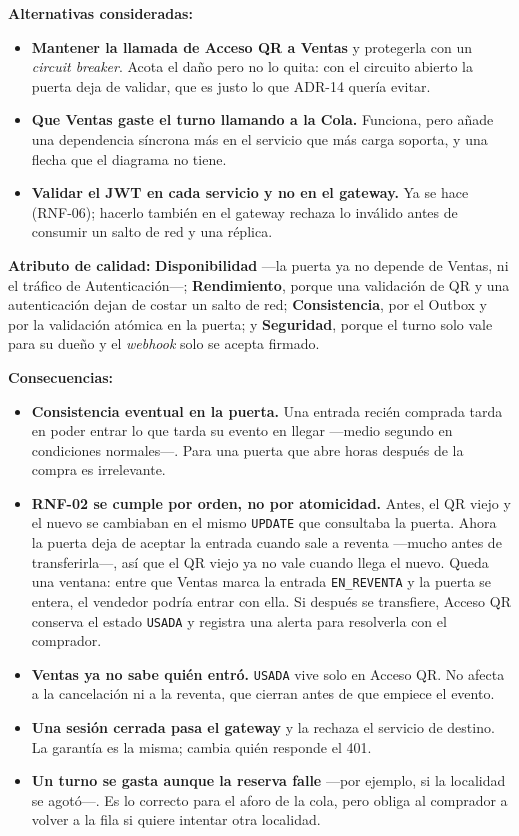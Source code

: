 \textbf{Alternativas consideradas:}
\begin{itemize}
  \item \textbf{Mantener la llamada de Acceso QR a Ventas} y protegerla con un
        \textit{circuit breaker}. Acota el daño pero no lo quita: con el
        circuito abierto la puerta deja de validar, que es justo lo que ADR-14
        quería evitar.
  \item \textbf{Que Ventas gaste el turno llamando a la Cola.} Funciona, pero
        añade una dependencia síncrona más en el servicio que más carga
        soporta, y una flecha que el diagrama no tiene.
  \item \textbf{Validar el JWT en cada servicio y no en el gateway.} Ya se hace
        (RNF-06); hacerlo también en el gateway rechaza lo inválido antes de
        consumir un salto de red y una réplica.
\end{itemize}

\textbf{Atributo de calidad:} \textbf{Disponibilidad} ---la puerta ya no
depende de Ventas, ni el tráfico de Autenticación---; \textbf{Rendimiento},
porque una validación de QR y una autenticación dejan de costar un salto de
red; \textbf{Consistencia}, por el Outbox y por la validación atómica en la
puerta; y \textbf{Seguridad}, porque el turno solo vale para su dueño y el
\textit{webhook} solo se acepta firmado.

\textbf{Consecuencias:}
\begin{itemize}
  \item \textbf{Consistencia eventual en la puerta.} Una entrada recién comprada
        tarda en poder entrar lo que tarda su evento en llegar ---medio segundo
        en condiciones normales---. Para una puerta que abre horas después de la
        compra es irrelevante.
  \item \textbf{RNF-02 se cumple por orden, no por atomicidad.} Antes, el QR
        viejo y el nuevo se cambiaban en el mismo \texttt{UPDATE} que consultaba
        la puerta. Ahora la puerta deja de aceptar la entrada cuando sale a
        reventa ---mucho antes de transferirla---, así que el QR viejo ya no
        vale cuando llega el nuevo. Queda una ventana: entre que Ventas marca la
        entrada \texttt{EN\_REVENTA} y la puerta se entera, el vendedor podría
        entrar con ella. Si después se transfiere, Acceso QR conserva el estado
        \texttt{USADA} y registra una alerta para resolverla con el comprador.
  \item \textbf{Ventas ya no sabe quién entró.} \texttt{USADA} vive solo en
        Acceso QR. No afecta a la cancelación ni a la reventa, que cierran antes
        de que empiece el evento.
  \item \textbf{Una sesión cerrada pasa el gateway} y la rechaza el servicio de
        destino. La garantía es la misma; cambia quién responde el 401.
  \item \textbf{Un turno se gasta aunque la reserva falle} ---por ejemplo, si la
        localidad se agotó---. Es lo correcto para el aforo de la cola, pero
        obliga al comprador a volver a la fila si quiere intentar otra
        localidad.
\end{itemize}

